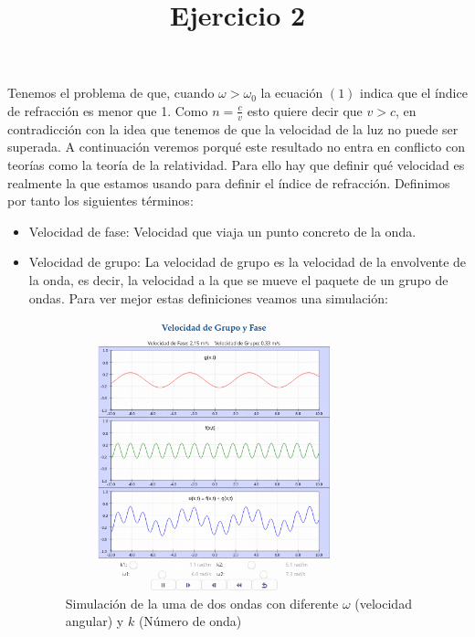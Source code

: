 \documentclass[a4paper]{article}
\title{Ejercicio 2}
\begin{document}
   \maketitle 
   Tenemos el problema de que, cuando $\omega > \omega_0$ la ecuación $\left( 1 \right) $ indica que el índice de refracción es menor que 1. Como $n=\frac{c}{v}$ esto quiere decir que $v>c$, en contradicción con la idea que tenemos de que la velocidad de la luz no puede ser superada. A continuación veremos porqué este resultado no entra en conflicto con teorías como la teoría de la relatividad. Para ello hay que definir qué velocidad es realmente la que estamos usando para definir el índice de refracción. Definimos por tanto los siguientes términos:

\begin{itemize}
    \item Velocidad de fase: Velocidad que viaja un punto concreto de la onda.  
    \item Velocidad de grupo: La velocidad de grupo es la velocidad de la envolvente de la onda, es decir, la velocidad a la que se mueve el paquete de un grupo de ondas. Para ver mejor estas definiciones veamos una simulación:
        \begin{figure}[H]
            \centering
            \includegraphics[width=0.8\textwidth]{simulacion.png}
            \caption{Simulación de la uma de dos ondas con diferente $\omega$ (velocidad angular) y $k$ (Número de onda)}
            \label{fig:simulacion-png}
        \end{figure}

\end{itemize}
\end{document}
